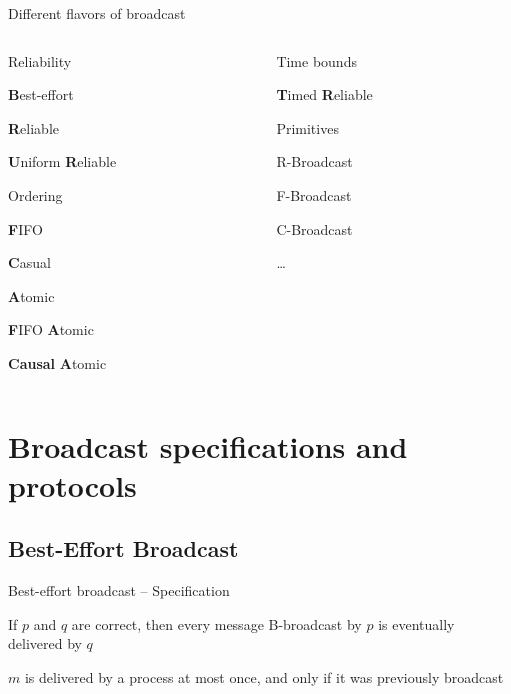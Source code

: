 \begin{frame}{Different flavors of broadcast}
	
\begin{columns}[t]
\begin{column}{0.5\textwidth}
\BIL

\item Reliability
\BI
\item \textbf{B}est-effort 
\item \textbf{R}eliable 
\item \textbf{U}niform \textbf{R}eliable 
\EI

\item Ordering

\BI
\item \textbf{F}IFO
\item \textbf{C}asual
\item \textbf{A}tomic
\item \textbf{F}IFO \textbf{A}tomic
\item \textbf{Causal} \textbf{A}tomic
\EI

\EIL
\end{column}
\begin{column}{0.5\textwidth}

\BIL 

\item Time bounds
\BI
\item \textbf{T}imed \textbf{R}eliable 
\EI

\item Primitives
\BI
\item R-Broadcast
\item F-Broadcast
\item C-Broadcast
\item \ldots
\EI

\EIL
\end{column}
\end{columns}

\end{frame}

\section{Broadcast specifications and protocols}

\subsection{Best-Effort Broadcast}

\begin{frame}{Best-effort broadcast -- Specification}

\begin{definition}
If $p$ and $q$ are correct, then every message B-broadcast by $p$ is eventually delivered by $q$
\end{definition}

\begin{definition}
$m$ is delivered by a process at most once, and only if it was previously broadcast
\end{definition}

\end{frame}

